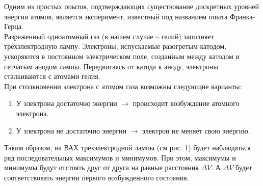 Одним из простых опытов, подтверждающих существование дискретных уровней энергии атомов,
является эксперимент, известный под названием опыта Франка-Герца. \\

Разреженный одноатомный газ (в нашем случае -- гелий) заполняет трёхэлектродную лампу.
Электроны, испускаемые разогретым катодом, ускоряются в постоянном электрическом поле,
созданным между катодом и сетчатым анодом лампы. Передвигаясь от катода к аноду, электроны
сталкиваются с атомами гелия. \\

При столкновении электрона с атомом газа возможны следующие варианты:

\begin{enumerate}
    \item У электрона достаточно энергии $ \longrightarrow $ происходит возбуждение
    атомного электрона.
    \item У электрона не достаточно энергии $ \longrightarrow $ электрон не меняет
    свою энергию.
\end{enumerate}

Таким образом, на ВАХ трехэлектродной лампы (см рис. 1) будет наблюдаться ряд
последовательных максимумов и минимумов. При этом, максимумы и минимумы будут
отстоять друг от друга на равные расстояния $ \Delta V $. А $ \Delta V $ будет
соответствовать энергии первого возбужденного состояния.
